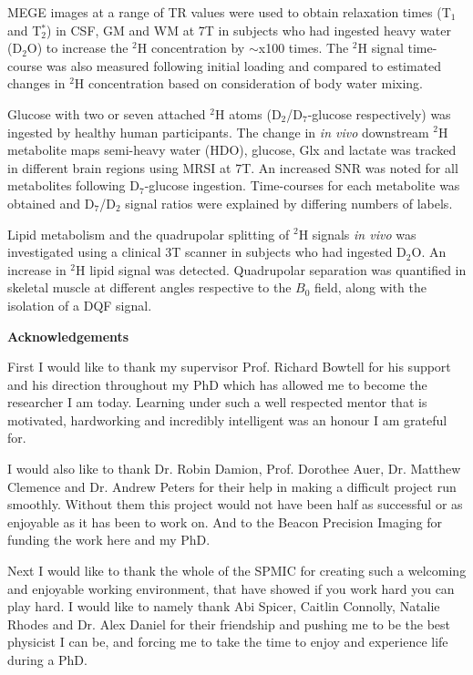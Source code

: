 \documentclass[12pt,english]{report}
\begin{document}
\ac{MEGE} images at a range of \ac{TR} values were used to obtain relaxation times (T$_1$ and T$_2^*$) in \ac{CSF}, \ac{GM} and \ac{WM} at 7T in subjects who had ingested heavy water (D$_2$O) to increase the $^2$H concentration by $\sim$x100 times. The $^2$H signal time-course was also measured following initial loading and compared to estimated changes in $^2$H concentration based on consideration of body water mixing.

Glucose with two or seven attached $^2$H atoms (D$_2$/D$_7$-glucose respectively) was ingested by healthy human participants. The change in \textit{in vivo} downstream $^2$H metabolite maps semi-heavy water (HDO), glucose, Glx and lactate was tracked in different brain regions using \ac{MRSI} at 7T. An increased \ac{SNR} was noted for all metabolites following D$_7$-glucose ingestion. Time-courses for each metabolite was obtained and D$_7$/D$_2$ signal ratios were explained by differing numbers of labels.

Lipid metabolism and the quadrupolar splitting of $^2$H signals \textit{in vivo} was investigated using a clinical 3T scanner in subjects who had ingested D$_2$O. An increase in $^2$H lipid signal was detected. Quadrupolar separation was quantified in skeletal muscle at different angles respective to the $B_0$ field, along with the isolation of a \ac{DQF} signal.

\newpage
\vspace*{\fill}

\newpage
\thispagestyle{plain}
\begin{center}
    \textbf{Acknowledgements}
\end{center}
First I would like to thank my supervisor Prof. Richard Bowtell for his support and his direction throughout my PhD which has allowed me to become the researcher I am today. Learning under such a well respected mentor that is motivated, hardworking and incredibly intelligent was an honour I am grateful for. 

I would also like to thank Dr. Robin Damion, Prof. Dorothee Auer, Dr. Matthew Clemence and Dr. Andrew Peters for their help in making a difficult project run smoothly. Without them this project would not have been half as successful or as enjoyable as it has been to work on. And to the Beacon Precision Imaging for funding the work here and my PhD.

Next I would like to thank the whole of the SPMIC for creating such a welcoming and enjoyable working environment, that have showed if you work hard you can play hard. I would like to namely thank Abi Spicer, Caitlin Connolly, Natalie Rhodes and Dr. Alex Daniel for their friendship and pushing me to be the best physicist I can be, and forcing me to take the time to enjoy and experience life during a PhD.
\end{document}
